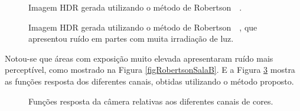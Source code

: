\begin{figure}[H]
  \centering
  \quad %
  \quad %
  \caption{Imagem HDR gerada utilizando o método de Robertson~\etal~\protect\cite{robertson}.}
  \label{figRobertsonOlhinhos}
\end{figure}


\begin{figure}[H]
  \centering
  \quad %
  \caption{Imagem HDR gerada utilizando o método de Robertson~\etal~\protect\cite{robertson}, que apresentou ruído em partes com muita irradiação de luz.}
  \label{figRobertsonSala}
\end{figure}

Notou-se que áreas com exposição muito elevada apresentaram ruído mais perceptível, como mostrado na Figura \ref{figRobertsonSalaB}. E a Figura \ref{figRobertsonFR} mostra as funções resposta dos diferentes canais, obtidas utilizando o método proposto.

\begin{figure}[H]
  \centering
  \quad %
  \caption{Funções resposta da câmera relativas aos diferentes canais de cores.}
  \label{figRobertsonFR}
\end{figure}

